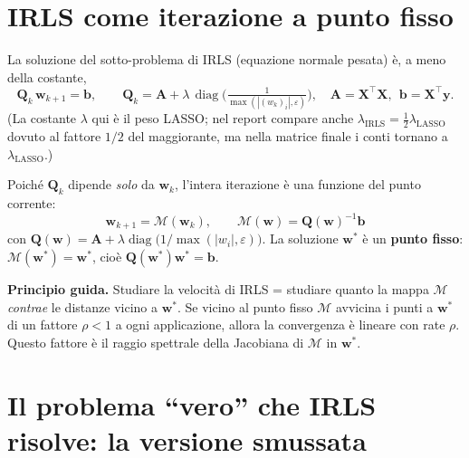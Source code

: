 \documentclass[11pt,a4paper]{article}
\theoremstyle{definition}
\newcommand{\w}{\bm{w}}
\newcommand{\X}{\bm{X}}
\newcommand{\y}{\bm{y}}
\newcommand{\A}{\bm{A}}
\newcommand{\bvec}{\bm{b}}
\newcommand{\Q}{\bm{Q}}
\newcommand{\wstar}{\w^{*}}
\newcommand{\Mmap}{\mathcal{M}}
\newcommand{\diag}{\operatorname{diag}}
\newcommand{\spec}{\rho}
\newcommand{\lam}{\lambda}
\newcommand{\eps}{\varepsilon}
\begin{document}
\section{IRLS come iterazione a punto fisso}
\label{sec:fixedpoint}

La soluzione del sotto-problema di IRLS (equazione normale pesata) è, a meno della costante,
\begin{equation}
\label{eq:system}
\Q_k\,\w_{k+1}=\bvec,\qquad
\Q_k=\A+\lam\,\diag\!\Big(\tfrac{1}{\max(|(w_k)_i|,\eps)}\Big),\quad
\A=\X^{\!\top}\X,\ \ \bvec=\X^{\!\top}\y .
\end{equation}
(La costante $\lam$ qui è il peso LASSO; nel report compare anche $\lam_{\text{IRLS}}=\tfrac12\lam_{\text{LASSO}}$
dovuto al fattore $1/2$ del maggiorante, ma nella matrice finale i conti tornano a $\lam_{\text{LASSO}}$.)

Poiché $\Q_k$ dipende \emph{solo} da $\w_k$, l'intera iterazione è una funzione del punto corrente:
\begin{equation}
\label{eq:map}
\boxed{\ \w_{k+1}=\Mmap(\w_k),\qquad \Mmap(\w)=\Q(\w)^{-1}\bvec\ }
\end{equation}
con $\Q(\w)=\A+\lam\diag\!\big(1/\max(|w_i|,\eps)\big)$. La soluzione $\wstar$ è un
\textbf{punto fisso}: $\Mmap(\wstar)=\wstar$, cioè $\Q(\wstar)\wstar=\bvec$.

\begin{keybox}
\textbf{Principio guida.} Studiare la velocità di IRLS = studiare quanto la mappa $\Mmap$
\emph{contrae} le distanze vicino a $\wstar$. Se vicino al punto fisso $\Mmap$ avvicina i
punti a $\wstar$ di un fattore $\spec<1$ a ogni applicazione, allora la convergenza è
lineare con rate $\spec$. Questo fattore è il raggio spettrale della Jacobiana di $\Mmap$
in $\wstar$.
\end{keybox}

\section{Il problema ``vero'' che IRLS risolve: la versione smussata}
\label{sec:smoothed}
\end{document}
